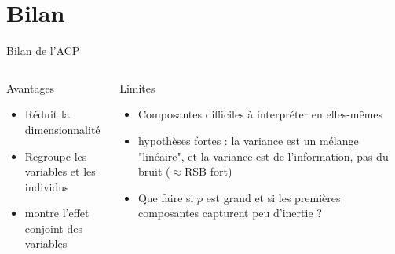 \documentclass{beamer}
\begin{document}
\section{Bilan}


\begin{frame}{Bilan de l'ACP}


  \begin{columns}[T,onlytextwidth]
        \begin{alertblock}{Avantages}
        	\begin{itemize}
        		\item Réduit la dimensionnalité
        		\item Regroupe les variables et les individus 
            \item montre l'effet conjoint des variables 
        	\end{itemize}
      	\end{alertblock}

    
      \begin{block}{Limites}
        \begin{itemize}
            \item Composantes difficiles à interpréter en elles-mêmes
            \item hypothèses fortes : la  variance est un mélange "linéaire", et la  variance est de l'information, pas du bruit ($\approx$RSB fort)
            \item Que faire si $p$ est grand et si les premières composantes capturent peu d'inertie ?
        \end{itemize}
      \end{block}

      
  \end{columns}
\end{frame}
\end{document}
